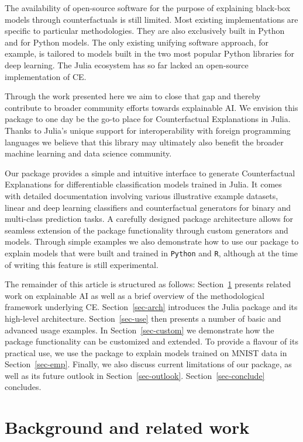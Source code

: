 \documentclass[
  letterpaper,
  DIV=11,
  numbers=noendperiod]{scrartcl}
\begin{document}
The availability of open-source software for the purpose of explaining
black-box models through counterfactuals is still limited. Most existing
implementations are specific to particular methodologies. They are also
exclusively built in Python and for Python models. The only existing
unifying software approach, for example, is tailored to models built in
the two most popular Python libraries for deep learning. The Julia
ecosystem has so far lacked an open-source implementation of CE.

Through the work presented here we aim to close that gap and thereby
contribute to broader community efforts towards explainable AI. We
envision this package to one day be the go-to place for Counterfactual
Explanations in Julia. Thanks to Julia's unique support for
interoperability with foreign programming languages we believe that this
library may ultimately also benefit the broader machine learning and
data science community.

Our package provides a simple and intuitive interface to generate
Counterfactual Explanations for differentiable classification models
trained in Julia. It comes with detailed documentation involving various
illustrative example datasets, linear and deep learning classifiers and
counterfactual generators for binary and multi-class prediction tasks. A
carefully designed package architecture allows for seamless extension of
the package functionality through custom generators and models. Through
simple examples we also demonstrate how to use our package to explain
models that were built and trained in \texttt{Python} and \texttt{R},
although at the time of writing this feature is still experimental.

The remainder of this article is structured as follows:
Section~\ref{sec-related} presents related work on explainable AI as
well as a brief overview of the methodological framework underlying CE.
Section~\ref{sec-arch} introduces the Julia package and its high-level
architecture. Section~\ref{sec-use} then presents a number of basic and
advanced usage examples. In Section~\ref{sec-custom} we demonstrate how
the package functionality can be customized and extended. To provide a
flavour of its practical use, we use the package to explain models
trained on MNIST data in Section~\ref{sec-emp}. Finally, we also discuss
current limitations of our package, as well as its future outlook in
Section~\ref{sec-outlook}. Section~\ref{sec-conclude} concludes.

\hypertarget{sec-related}{%
\section{Background and related work}\label{sec-related}}
\end{document}

